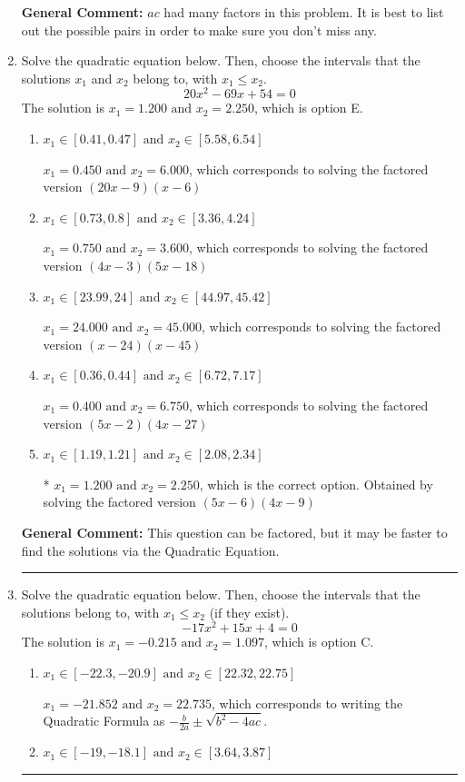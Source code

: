 \documentclass{extbook}[14pt]
\newcommand{\litem}[1]{\item #1

\rule{\textwidth}{0.4pt}}
\begin{document}
\begin{enumerate}
{\textbf{General Comment:} $ac$ had many factors in this problem. It is best to list out the possible pairs in order to make sure you don't miss any.
}
\litem{
Solve the quadratic equation below. Then, choose the intervals that the solutions $x_1$ and $x_2$ belong to, with $x_1 \leq x_2$.
\[ 20x^{2} -69 x + 54 = 0 \]The solution is \( x_1 = 1.200 \text{ and } x_2 = 2.250 \), which is option E.\begin{enumerate}[label=\Alph*.]
\item \( x_1 \in [0.41, 0.47] \text{ and } x_2 \in [5.58, 6.54] \)

$x_1 = 0.450 \text{ and } x_2 = 6.000$, which corresponds to solving the factored version $(20x -9)(x -6)$
\item \( x_1 \in [0.73, 0.8] \text{ and } x_2 \in [3.36, 4.24] \)

$x_1 = 0.750 \text{ and } x_2 = 3.600$, which corresponds to solving the factored version $(4x -3)(5x -18)$
\item \( x_1 \in [23.99, 24] \text{ and } x_2 \in [44.97, 45.42] \)

$x_1 = 24.000 \text{ and } x_2 = 45.000$, which corresponds to solving the factored version $(x -24)(x -45)$
\item \( x_1 \in [0.36, 0.44] \text{ and } x_2 \in [6.72, 7.17] \)

$x_1 = 0.400 \text{ and } x_2 = 6.750$, which corresponds to solving the factored version $(5x -2)(4x -27)$
\item \( x_1 \in [1.19, 1.21] \text{ and } x_2 \in [2.08, 2.34] \)

* $x_1 = 1.200 \text{ and } x_2 = 2.250$, which is the correct option. Obtained by solving the factored version $(5x -6)(4x -9)$
\end{enumerate}

\textbf{General Comment:} This question can be factored, but it may be faster to find the solutions via the Quadratic Equation.
}
\litem{
Solve the quadratic equation below. Then, choose the intervals that the solutions belong to, with $x_1 \leq x_2$ (if they exist).
\[ -17x^{2} +15 x + 4 = 0 \]The solution is \( x_1 = -0.215 \text{ and } x_2 = 1.097 \), which is option C.\begin{enumerate}[label=\Alph*.]
\item \( x_1 \in [-22.3, -20.9] \text{ and } x_2 \in [22.32, 22.75] \)

 $x_1 = -21.852 \text{ and } x_2 = 22.735$, which corresponds to writing the Quadratic Formula as $-\frac{b}{2a} \pm \sqrt{b^2 - 4ac}$.
\item \( x_1 \in [-19, -18.1] \text{ and } x_2 \in [3.64, 3.87] \)


\end{enumerate}}
\end{enumerate}
\end{document}
